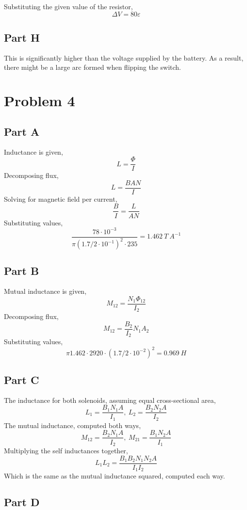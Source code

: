 \documentclass{article}
\begin{document}
Substituting the given value of the resistor,
$$ \Delta V = 80 \varepsilon $$

\subsection*{Part H}

This is significantly higher than the voltage supplied by the battery. As a
result, there might be a large arc formed when flipping the switch.

\section*{Problem 4}

\subsection*{Part A}

Inductance is given,
$$ L = \frac{\Phi}{I} $$
Decomposing flux,
$$ L = \frac{B A N}{I} $$
Solving for magnetic field per current,
$$ \frac{B}{I} = \frac{L}{AN} $$
Substituting values,
$$ \frac{78 \cdot 10^{-3}}{\pi (1.7/2 \cdot 10^{-1})^2 \cdot 235} = 1.462\
\si{T\ A^{-1}} $$

\subsection*{Part B}

Mutual inductance is given,
$$ M_{12} = \frac{N_1 \Phi_{12}}{I_2} $$
Decomposing flux,
$$ M_{12} = \frac{B_2}{I_2} N_1 A_2 $$
Substituting values,
$$ \pi 1.462 \cdot 2920 \cdot (1.7/2 \cdot 10^{-2})^2 = 0.969\ \si{H} $$

\subsection*{Part C}

The inductance for both solenoids, assuming equal cross-sectional area,
$$ L_1 = \frac{B_1 N_1 A}{I_1},\ L_2 = \frac{B_2 N_2 A}{I_2} $$
The mutual inductance, computed both ways,
$$ M_{12} = \frac{B_2 N_1 A}{I_2},\ M_{21} = \frac{B_1 N_2 A}{I_1} $$
Multiplying the self inductances together,
$$ L_1 L_2 = \frac{B_1 B_2 N_1 N_2 A}{I_1 I_2} $$
Which is the same as the mutual inductance squared, computed each way.

\subsection*{Part D}
\end{document}
